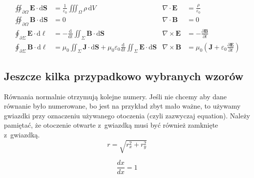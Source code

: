 \begin{align}
    \oiint\nolimits_{\partial \Omega} \pmb{E} \cdot \mathrm{d}\pmb{S}          & = \frac{1}{\varepsilon_0} \iiint\nolimits_\Omega \rho \, \mathrm{d}V                                                                                                         & \nabla \cdot \pmb{E}  & = \frac {\rho} {\varepsilon_0} \label{eq:maxwell1}                                                    \\
    \oiint\nolimits_{\partial \Omega} \pmb{B} \cdot \mathrm{d}\pmb{S}          & = 0                                                                                                                                                                          & \nabla \cdot \pmb{B}  & = 0 \label{eq:maxwell2}                                                                               \\
    \oint\nolimits_{\partial \Sigma} \pmb{E} \cdot \mathrm{d}\boldsymbol{\ell} & = -\frac{\mathrm{d}}{\mathrm{d}t}\iint\nolimits_{\Sigma}\pmb{B}\cdot\mathrm{d}\pmb{S}                                                                                        & \nabla \times \pmb{E} & = -\frac{\partial \pmb{B}}{\partial t} \label{eq:maxwell3}                                            \\
    \oint\nolimits_{\partial \Sigma} \pmb{B} \cdot \mathrm{d}\boldsymbol{\ell} & = \mu_0 \iint\nolimits_{\Sigma} \pmb{J} \cdot \mathrm{d}\pmb{S} + \mu_0 \varepsilon_0 \frac{\mathrm{d}}{\mathrm{d}t} \iint\nolimits_{\Sigma} \pmb{E} \cdot \mathrm{d}\pmb{S} & \nabla \times \pmb{B} & = \mu_0\left(\pmb{J} + \varepsilon_0 \frac{\partial \pmb{E}} {\partial t} \right) \label{eq:maxwell4}
\end{align}


\subsection{Jeszcze kilka przypadkowo wybranych wzorów}
Równania normalnie otrzymują kolejne numery. Jeśli nie chcemy aby dane równanie było numerowane, bo jest na przykład zbyt mało ważne, to używamy gwiazdki przy oznaczeniu używanego otoczenia (czyli zazwyczaj equation). Należy pamiętać, że otoczenie otwarte z~gwiazdką musi być również zamknięte z~gwiazdką.
\begin{equation*}
    r = \sqrt{r_x^2 + r_y^2}
\end{equation*}

\begin{equation}
    \frac{dx}{dx} = 1
\end{equation}

